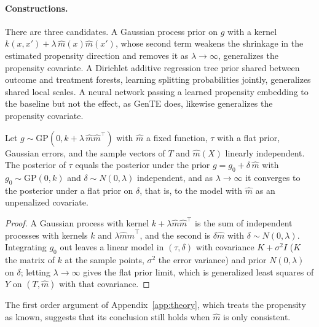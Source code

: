 \paragraph{Constructions.} There are three candidates. A Gaussian process prior on $g$ with a kernel $k(x, x') + \lambda\,\hat m(x)\hat m(x')$, whose second term weakens the shrinkage in the estimated propensity direction and removes it as $\lambda \to \infty$, generalizes the propensity covariate. A Dirichlet additive regression tree prior shared between outcome and treatment forests, learning splitting probabilities jointly, generalizes shared local scales. A neural network passing a learned propensity embedding to the baseline but not the effect, as GenTE does, likewise generalizes the propensity covariate.



\begin{proposition}
Let $g \sim \mathrm{GP}(0, k + \lambda\,\hat m\hat m^\top)$ with $\hat m$ a fixed function, $\tau$ with a flat prior, Gaussian errors, and the sample vectors of $T$ and $\hat m(X)$ linearly independent. The posterior of $\tau$ equals the posterior under the prior $g = g_0 + \delta\,\hat m$ with $g_0 \sim \mathrm{GP}(0, k)$ and $\delta \sim N(0, \lambda)$ independent, and as $\lambda \to \infty$ it converges to the posterior under a flat prior on $\delta$, that is, to the model with $\hat m$ as an unpenalized covariate.
\end{proposition}

\begin{proof}
A Gaussian process with kernel $k + \lambda\hat m\hat m^\top$ is the sum of independent processes with kernels $k$ and $\lambda\hat m\hat m^\top$, and the second is $\delta\hat m$ with $\delta \sim N(0, \lambda)$. Integrating $g_0$ out leaves a linear model in $(\tau, \delta)$ with covariance $K + \sigma^2 I$ ($K$ the matrix of $k$ at the sample points, $\sigma^2$ the error variance) and prior $N(0, \lambda)$ on $\delta$; letting $\lambda \to \infty$ gives the flat prior limit, which is generalized least squares of $Y$ on $(T, \hat m)$ with that covariance.
\end{proof}

The first order argument of Appendix~\ref{app:theory}, which treats the propensity as known, suggests that its conclusion still holds when $\hat m$ is only consistent.

